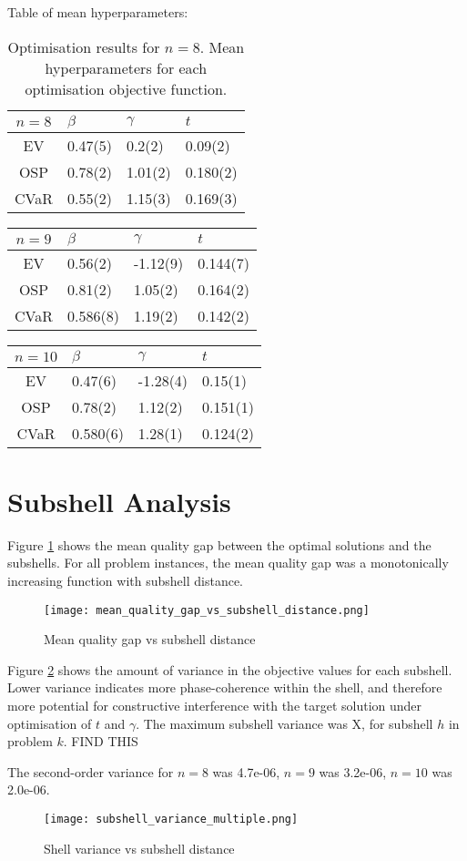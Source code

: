 Table of mean hyperparameters:

\begin{table}[htbp]
\begin{tabular}{c||l|l|l}
   $n=8$ & $\beta$ & $\gamma$& $t$     \\\hline\hline
    EV   & 0.47(5) & 0.2(2)  & 0.09(2) \\\hline
    OSP  & 0.78(2) & 1.01(2) & 0.180(2) \\\hline
    CVaR & 0.55(2) & 1.15(3) & 0.169(3) \\\hline
\end{tabular}
\caption{Optimisation results for $n=8$. Mean hyperparameters for each optimisation objective function.}
\label{tab:n=8}
\end{table}

\begin{tabular}{c||l|l|l}
   $n=9$ & $\beta$  & $\gamma$ & $t$     \\\hline\hline
    EV   & 0.56(2)  & -1.12(9) & 0.144(7) \\\hline
    OSP  & 0.81(2)  & 1.05(2)  & 0.164(2) \\\hline
    CVaR & 0.586(8) & 1.19(2)  & 0.142(2) \\\hline
\end{tabular}

\begin{tabular}{c||l|l|l}
  $n=10$ &$\beta$  & $\gamma$ & $t$     \\\hline\hline
    EV   & 0.47(6)  & -1.28(4) & 0.15(1) \\\hline
    OSP  & 0.78(2)  & 1.12(2)  & 0.151(1) \\\hline
    CVaR & 0.580(6) & 1.28(1)  & 0.124(2) \\\hline
\end{tabular}


\section{Subshell Analysis}
Figure \ref{fig:mqg} shows the mean quality gap between the optimal solutions and the subshells. For all problem instances, the mean quality gap was a monotonically increasing function with subshell distance.
\begin{figure}[htbp]
    \centering
    \texttt{[image: mean\_quality\_gap\_vs\_subshell\_distance.png]}
    \caption{Mean quality gap vs subshell distance}
    \label{fig:mqg}
\end{figure}

Figure \ref{fig:shell variance} shows the amount of variance in the objective values for each subshell.
Lower variance indicates more phase-coherence within the shell, and therefore more potential for constructive interference with the target solution under optimisation of $t$ and $\gamma$. The maximum subshell variance was X, for subshell $h$ in problem $k$. FIND THIS

The second-order variance for $n=8$ was 4.7e-06, $n=9$ was 3.2e-06, $n=10$ was 2.0e-06.
\begin{figure}[htbp]
    \centering
    \texttt{[image: subshell\_variance\_multiple.png]}
    \caption{Shell variance vs subshell distance}
    \label{fig:shell variance}
\end{figure}